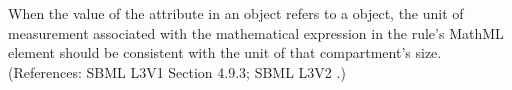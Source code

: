 When the value of the attribute  in an \AssignmentRule
object refers to a \Compartment object, the unit of measurement associated
with the mathematical expression in the rule's MathML  element
should be consistent with the unit of that compartment's size.
(References: SBML L3V1 Section 4.9.3; SBML L3V2 .)
